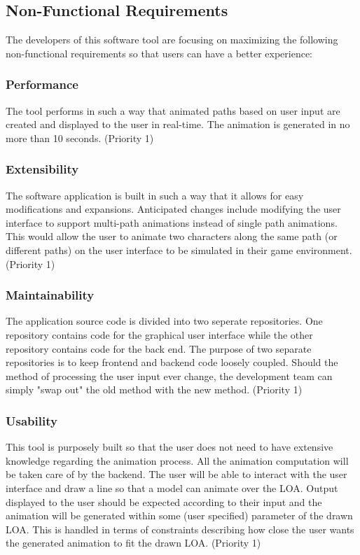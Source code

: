 \subsection{Non-Functional Requirements}
The developers of this software tool are focusing on maximizing the following non-functional requirements so that users can have a better experience:

\subsubsection{Performance}
The tool performs in such a way that animated paths based on user input are created and displayed to the user in real-time. The animation is generated in no more than 10 seconds. (Priority 1) 

\subsubsection{Extensibility}
The software application is built in such a way that it allows for easy modifications and expansions. Anticipated changes include modifying the user interface to support multi-path animations instead of single path animations. This would allow the user to animate two characters along the same path (or different paths) on the user interface to be simulated in their game environment. (Priority 1) 

\subsubsection{Maintainability}
The application source code is divided into two seperate repositories. One repository contains code for the graphical user interface while the other repository contains code for the back end. The purpose of two separate repositories is to keep frontend and backend code loosely coupled. Should the method of processing the user input ever change, the development team can simply "swap out" the old method with the new method. (Priority 1) 

\subsubsection{Usability}
This tool is purposely built so that the user does not need to have extensive knowledge regarding the animation process. All the animation computation will be taken care of by the backend. The user will be able to interact with the user interface and draw a line so that a model can animate over the LOA. Output displayed to the user should be expected according to their input and the animation will be generated within some (user specified) parameter of the drawn LOA. This is handled in terms of constraints describing how close the user wants the generated animation to fit the drawn LOA. (Priority 1) 

